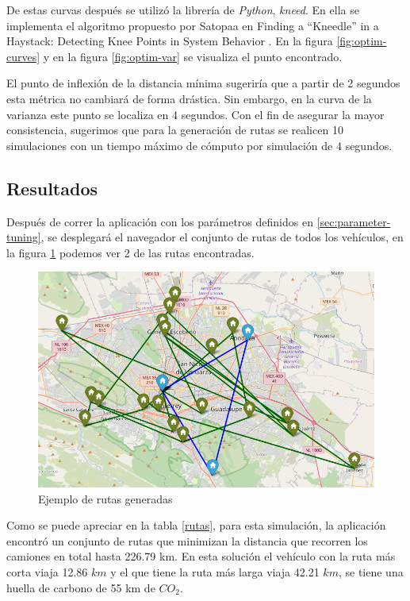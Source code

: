 \documentclass[journal]{IEEEtran}
\begin{document}
            De estas curvas después se utilizó la librería de \emph{Python}, \emph{kneed}. En ella se implementa el algoritmo propuesto por Satopaa en Finding a “Kneedle” in a Haystack: Detecting Knee Points in System Behavior \cite{satopaa2011finding}. En la figura \ref{fig:optim-curves} y en la figura \ref{fig:optim-var} se visualiza el punto encontrado.

            El punto de inflexión de la distancia mínima sugeriría que a partir de 2 segundos esta métrica no cambiará de forma drástica. Sin embargo, en la curva de la varianza este punto se localiza en 4 segundos. Con el fin de asegurar la mayor consistencia, sugerimos que para la generación de rutas se realicen 10 simulaciones con un tiempo máximo de cómputo por simulación de 4 segundos.

        \subsection{Resultados}

            Después de correr la aplicación con los parámetros definidos en \ref{sec:parameter-tuning}, se desplegará el navegador el conjunto de rutas de todos los vehículos, en la figura \ref{fig:generated-routes} podemos ver 2 de las rutas encontradas.
        
            \begin{figure}[H]
                \centering
                \includegraphics[scale=0.4]{../img/route-examples.png}
                \caption{Ejemplo de rutas generadas} 
                \label{fig:generated-routes}
            \end{figure}
            
            Como se puede apreciar en la tabla \ref{rutas}, para esta simulación, la aplicación encontró un conjunto de rutas que minimizan la distancia que recorren los camiones en total hasta 226.79 km. En esta solución el vehículo con la ruta más corta viaja 12.86 $km$ y el que tiene la ruta más larga viaja 42.21 $km$, se tiene una huella de carbono de 55 km de $CO_2$.
            
\end{document}
